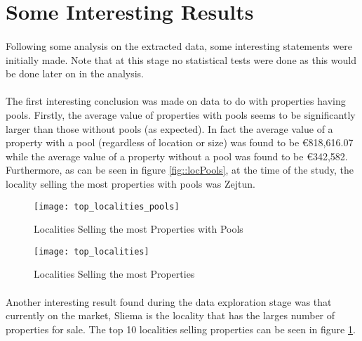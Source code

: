 \section{Some Interesting Results}
\paragraph{ }Following some analysis on the extracted data, some interesting statements were initially made. Note that at this stage no statistical tests were done as this would be done later on in the analysis.

\paragraph{ }The first interesting conclusion was made on data to do with properties having pools. Firstly, the average value of properties with pools seems to be significantly larger than those without pools (as expected). In fact the average value of a property with a pool (regardless of location or size) was found to be \euro 818,616.07 while the average value of a property without a pool was found to be \euro 342,582. Furthermore, as can be seen in figure \ref{fig::locPools}, at the time of the study, the locality selling the most properties with pools was Zejtun. 

\begin{figure}[!b]
	\begin{minipage}[b]{0.45\linewidth}
		\centering
		\texttt{[image: top\_localities\_pools]}
		\caption[Pools]{Localities Selling the most Properties with Pools}
		\label{fig::locPools}
	\end{minipage}	
	\hspace{0.5cm}
	\begin{minipage}[b]{0.45\linewidth}
		\centering
		\texttt{[image: top\_localities]}
		\caption[Top Localities]{Localities Selling the most Properties}
		\label{fig::toplocalities}
	\end{minipage}	
\end{figure}

\paragraph{ }Another interesting result found during the data exploration stage was that currently on the market, Sliema is the locality that has the larges number of properties for sale. The top 10 localities selling properties can be seen in figure \ref{fig::toplocalities}.

